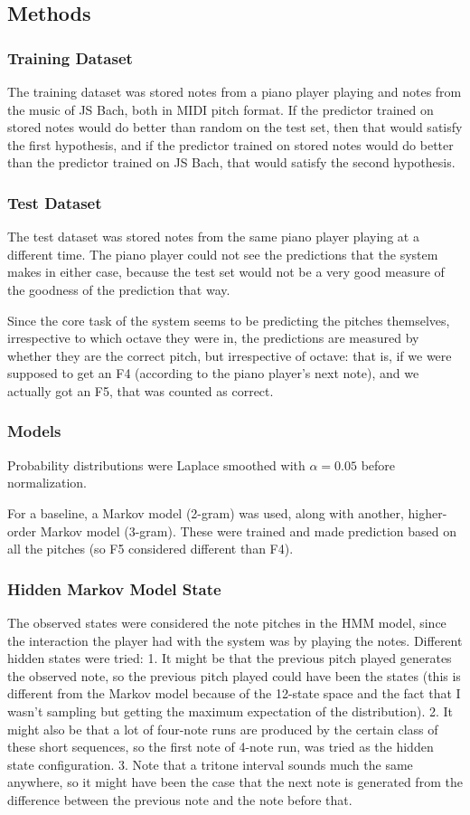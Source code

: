 \documentclass{article}
\begin{document}
\subsection*{Methods}
\subsubsection*{Training Dataset}
The training dataset was stored notes from a piano player playing and notes from the music of JS Bach, both in MIDI pitch format. If the predictor trained on stored notes would do better than random on the test set, then that would satisfy the first hypothesis, and if the predictor trained on stored notes would do better than the predictor trained on JS Bach, that would satisfy the second hypothesis.
\subsubsection*{Test Dataset}
The test dataset was stored notes from the same piano player playing at a different time. The piano player could not see the predictions that the system makes in either case, because the test set would not be a very good measure of the goodness of the prediction that way.

Since the core task of the system seems to be predicting the pitches themselves, irrespective to which octave they were in, the predictions are measured by whether they are the correct pitch, but irrespective of octave: that is, if we were supposed to get an F4 (according to the piano player's next note), and we actually got an F5, that was counted as correct.
\subsubsection*{Models}

Probability distributions were Laplace smoothed with $\alpha = 0.05$ before normalization.

For a baseline, a Markov model (2-gram) was used, along with another, higher-order Markov model (3-gram). These were trained and made prediction based on all the pitches (so F5 considered different than F4).

\subsubsection*{Hidden Markov Model State}
The observed states were considered the note pitches in the HMM model, since the interaction the player had with the system was by playing the notes.
Different hidden states were tried:
1. It might be that the previous pitch played generates the observed note, so the previous pitch played could have been the states (this is different from the Markov model because of the 12-state space and the fact that I wasn't sampling but getting the maximum expectation of the distribution).
2. It might also be that a lot of four-note runs are produced by the certain class of these short sequences, so the first note of 4-note run, was tried as the hidden state configuration.
3. Note that a tritone interval sounds much the same anywhere, so it might have been the case that the next note is generated from the difference between the previous note and the note before that.
\end{document}
